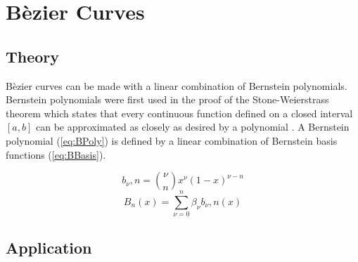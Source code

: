 \documentclass[12pt, letterpaper]{article}
\begin{document}
\section{B\`ezier Curves}
\subsection{Theory}
B\`ezier curves can be made with a linear combination of Bernstein polynomials. Bernstein polynomials were
first used in the proof of the Stone-Weierstrass theorem which states that every continuous function defined
on a closed interval $[a,b]$ can be approximated as closely as desired by a polynomial \citep{weierstrass}.
A Bernstein polynomial (\ref{eq:BPoly}) is defined by a linear combination of Bernstein basis functions
(\ref{eq:BBasis}).

\begin{equation}
  \label{eq:BBasis}
  b_\nu,n = {\nu \choose n} x^\nu (1 - x)^{\nu - n}
\end{equation}
\begin{equation}
  \label{eq:BPoly}
  B_n(x) = \sum_{\nu = 0}^{n}\beta_\nu b_\nu,n (x)
\end{equation}


\subsection{Application}



\end{document}
